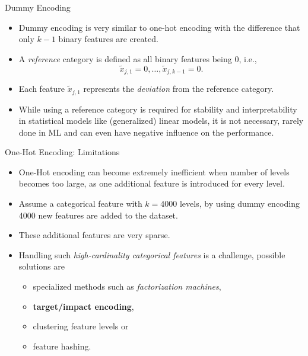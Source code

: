 \documentclass[11pt,compress,t,notes=noshow, xcolor=table]{beamer}
\begin{document}
\begin{vbframe}{Dummy Encoding}

\begin{itemize}
\item Dummy encoding is very similar to one-hot encoding with the difference that only $k-1$ binary features are created.

\item A \textit{reference} category is defined as all binary features being $0$, i.e.,
$$\tilde x_{j,1} = 0, \dots, \tilde x_{j,k-1} = 0.$$

\item Each feature $\tilde x_{j,1}$ represents the \textit{deviation} from the reference category.

\item While using a reference category is required for stability and interpretability in statistical models like (generalized) linear models, it is not necessary, rarely done in ML and can even have negative influence on the performance.
\end{itemize}

\end{vbframe}


\begin{vbframe}{One-Hot Encoding: Limitations}

\begin{itemize}
\item One-Hot encoding can become extremely inefficient when number of levels becomes too large, as one additional feature is introduced for every level.

\item Assume a categorical feature with $k=4000$ levels, by using dummy encoding 4000 new features are added to the dataset.

\item These additional features are very sparse.

\item Handling such \textit{high-cardinality categorical features} is a challenge, possible solutions are
    \begin{itemize}
    \item specialized methods such as \textit{factorization machines},
    \item \textbf{target/impact encoding},
    \item clustering feature levels or
    \item feature hashing.
    \end{itemize}
\end{itemize}

\end{vbframe}
\end{document}
